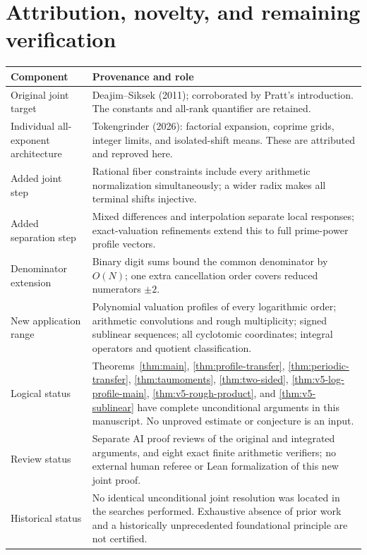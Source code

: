 \section{Attribution, novelty, and remaining verification}
\begin{center}
\small
\begin{tabular}{p{}p{}}
\toprule
Component & Provenance and role\\
\midrule
Original joint target & Deajim--Siksek (2011); corroborated by Pratt's introduction. The constants and all-rank quantifier are retained.\\[4pt]
Individual all-exponent architecture & Tokengrinder (2026): factorial expansion, coprime grids, integer limits, and isolated-shift means. These are attributed and reproved here.\\[4pt]
Added joint step & Rational fiber constraints include every arithmetic normalization simultaneously; a wider radix makes all terminal shifts injective.\\[4pt]
Added separation step & Mixed differences and interpolation separate local responses; exact-valuation refinements extend this to full prime-power profile vectors.\\[4pt]
Denominator extension & Binary digit sums bound the common denominator by $O(N)$; one extra cancellation order covers reduced numerators $\pm2$.\\[4pt]
New application range & Polynomial valuation profiles of every logarithmic order; arithmetic convolutions and rough multiplicity; signed sublinear sequences; all cyclotomic coordinates; integral operators and quotient classification.\\[4pt]
Logical status & Theorems~\ref{thm:main}, \ref{thm:profile-transfer}, \ref{thm:periodic-transfer}, \ref{thm:taumoments}, \ref{thm:two-sided}, \ref{thm:v5-log-profile-main}, \ref{thm:v5-rough-product}, and \ref{thm:v5-sublinear} have complete unconditional arguments in this manuscript. No unproved estimate or conjecture is an input.\\[4pt]
Review status & Separate AI proof reviews of the original and integrated arguments, and eight exact finite arithmetic verifiers; no external human referee or Lean formalization of this new joint proof.\\[4pt]
Historical status & No identical unconditional joint resolution was located in the searches performed. Exhaustive absence of prior work and a historically unprecedented foundational principle are not certified.\\
\bottomrule
\end{tabular}
\end{center}

